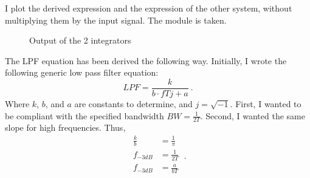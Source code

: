 \noindent I plot the derived expression and the expression of the other system, without multiplying them by the input signal. The module is taken. %
\begin{figure} [H] \centering  
{}
\caption{Output of the 2 integrators}
\end{figure}
%
\noindent The LPF equation has been derived the following way. Initially, I wrote the following generic low pass filter equation:
\begin{equation}
   LPF = \frac{k}{b \cdot f T j + a} \ .
\end{equation}
\noindent Where $k$, $b$, and $a$ are constants to determine, and $j = \sqrt{-1}$. First, I wanted to be compliant with the specified bandwidth $BW = \frac{1}{2 T}$. Second, I wanted the same slope for high frequencies. Thus,
\begin{equation}
   \begin{split}
      \frac{k}{b} &= \frac{1}{\pi} \\
      f_{-3 dB} &= \frac{1}{2 T} \\
      f_{-3 dB} &= \frac{a}{b T} \\
   \end{split} \ .
\end{equation}
